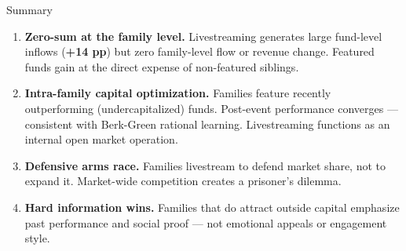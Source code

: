 \documentclass[11pt, aspectratio=169]{beamer}
\newcommand{\hl}[1]{\textcolor{myblue}{\textbf{#1}}}
\newcommand{\hlg}[1]{\textcolor{mygold}{\textbf{#1}}}
\begin{document}
\begin{frame}{Summary}

\begin{enumerate}\addtolength{\itemsep}{0.2cm}

  \item[\hlg{(1)}] \textbf{Zero-sum at the family level.}
  Livestreaming generates large fund-level inflows (\hl{+14 pp}) but
  zero family-level flow or revenue change.
  Featured funds gain at the direct expense of non-featured siblings.

  \item[\hlg{(2)}] \textbf{Intra-family capital optimization.}
  Families feature recently outperforming (undercapitalized) funds.
  Post-event performance converges --- consistent with Berk-Green
  rational learning. Livestreaming functions as an internal open
  market operation.

  \item[\hlg{(3)}] \textbf{Defensive arms race.}
  Families livestream to defend market share, not to expand it.
  Market-wide competition creates a prisoner's dilemma.

  \item[\hlg{(4)}] \textbf{Hard information wins.}
  Families that do attract outside capital emphasize past performance
  and social proof --- not emotional appeals or engagement style.

\end{enumerate}

\end{frame}

\end{document}
